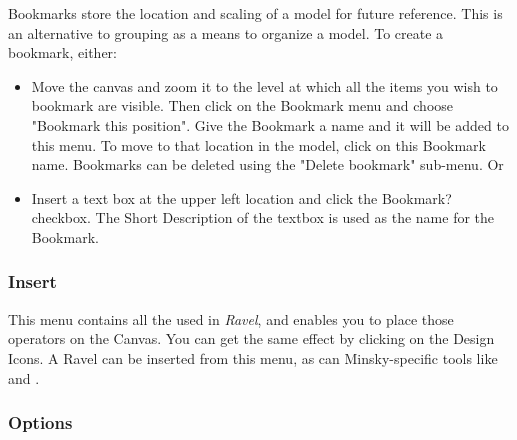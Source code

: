 \label{Bookmarks} Bookmarks store the location and scaling of a model
for future reference. This is an alternative to grouping as a means
to organize a model. To create a bookmark, either:
\begin{itemize}
\item Move the canvas and zoom it to the level at which all the items you
wish to bookmark are visible. Then click on the Bookmark menu and
choose "Bookmark this position". Give the Bookmark a name and it
will be added to this menu. To move to that location in the model,
click on this Bookmark name. Bookmarks can be deleted using the "Delete
bookmark" sub-menu. Or
\item Insert a text box at the upper left location and click the Bookmark?
checkbox. The Short Description of the textbox is used as the name
for the Bookmark.
\end{itemize}

\subsubsection{Insert}

\label{Insert}

This menu contains all the 
used in \emph{Ravel}, and enables you to place those operators on
the Canvas. You can get the same effect by clicking on the Design
Icons. A Ravel can be inserted from this menu, as can Minsky-specific
tools like  and .

\subsubsection{Options}

\label{Options}


